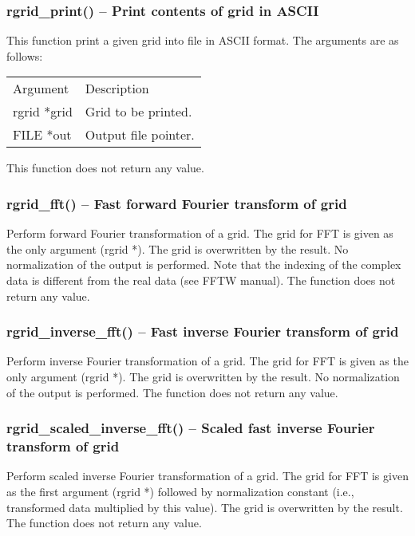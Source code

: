 \documentclass[12pt,letterpaper]{article}
\begin{document}
\subsubsection{rgrid\_print() -- Print contents of grid in ASCII}

This function print a given grid into file in ASCII format. The arguments are as follows:
\begin{longtable}{p{} p{}}
Argument & Description\\
\cline{1-2}
rgrid *grid & Grid to be printed.\\
FILE *out & Output file pointer.\\
\end{longtable}
\noindent
This function does not return any value.

\subsubsection{rgrid\_fft() -- Fast forward Fourier transform of grid}

Perform forward Fourier transformation of a grid. The grid for FFT is given as the only argument (rgrid *). The grid is overwritten by the result. No normalization of the output is performed. Note that the indexing of the complex data is different from the real data (see FFTW manual). The function does not return any value. 

\subsubsection{rgrid\_inverse\_fft() -- Fast inverse Fourier transform of grid}

Perform inverse Fourier transformation of a grid. The grid for FFT is given as the only argument (rgrid *). The grid is overwritten by the result. No normalization of the output is performed. The function does not return any value.

\subsubsection{rgrid\_scaled\_inverse\_fft() -- Scaled fast inverse Fourier transform of grid}

Perform scaled inverse Fourier transformation of a grid. The grid for FFT is given as the first argument (rgrid *) followed by normalization constant (i.e., transformed data multiplied by this value). The grid is overwritten by the result. The function does not return any value.
\end{document}
